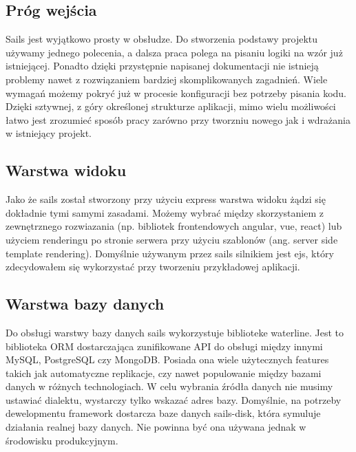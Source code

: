 \documentclass[12pt]{report}
\begin{document}
    \subsection{Próg wejścia}
      Sails jest wyjątkowo prosty w obsłudze.
      Do stworzenia podstawy projektu używamy jednego polecenia, a dalsza praca polega na pisaniu logiki na wzór już istniejącej.
      Ponadto dzięki przystępnie napisanej dokumentacji nie istnieją problemy nawet z rozwiązaniem bardziej skomplikowanych zagadnień.
      Wiele wymagań możemy pokryć już w procesie konfiguracji bez potrzeby pisania kodu.
      Dzięki sztywnej, z góry określonej strukturze aplikacji, mimo wielu możliwości łatwo jest zrozumieć sposób pracy zarówno przy tworzniu nowego jak i wdrażania w istniejący projekt. 

    \subsection{Warstwa widoku}
      Jako że sails został stworzony przy użyciu express warstwa widoku żądzi się dokładnie tymi samymi zasadami.
      Możemy wybrać między skorzystaniem z zewnętrznego rozwiazania (np. bibliotek frontendowych angular, vue, react) lub użyciem renderingu po stronie serwera przy użyciu szablonów (ang. server side template rendering).
      Domyślnie używanym przez sails silnikiem jest ejs, który zdecydowałem się wykorzystać przy tworzeniu przykładowej aplikacji.

    \subsection{Warstwa bazy danych}
      Do obsługi warstwy bazy danych sails wykorzystuje biblioteke waterline.
      Jest to biblioteka ORM dostarczająca zunifikowane API do obsługi między innymi MySQL, PostgreSQL czy MongoDB.
      Posiada ona wiele użytecznych features takich jak automatyczne replikacje, czy nawet populowanie między bazami danych w różnych technologiach. 
      W celu wybrania źródła danych nie musimy ustawiać dialektu, wystarczy tylko wskazać adres bazy.
      Domyślnie, na potrzeby dewelopmentu framework dostarcza baze danych sails-disk, która symuluje działania realnej bazy danych.
      Nie powinna być ona używana jednak w środowisku produkcyjnym.
\end{document}
